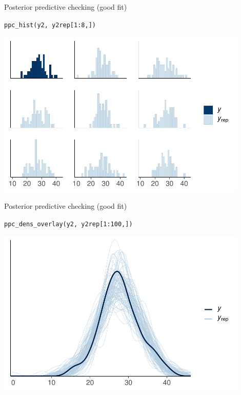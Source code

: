 \documentclass[t]{beamer}
\begin{document}
  
\begin{frame}{Posterior predictive checking (good fit)}

  \vspace{-1\baselineskip}
  \texttt{ppc\_hist(y2, y2rep[1:8,])}
  
  \includegraphics[height=8cm]{Newcomb_ppc_hist_nooutliers.pdf}

\end{frame}

\begin{frame}{Posterior predictive checking (good fit)}

  \vspace{-1\baselineskip}
  \texttt{ppc\_dens\_overlay(y2, y2rep[1:100,])}
  
  \includegraphics[height=8cm]{Newcomb_ppc_dens_overlay_nooutliers.pdf}

\end{frame}
\end{document}
